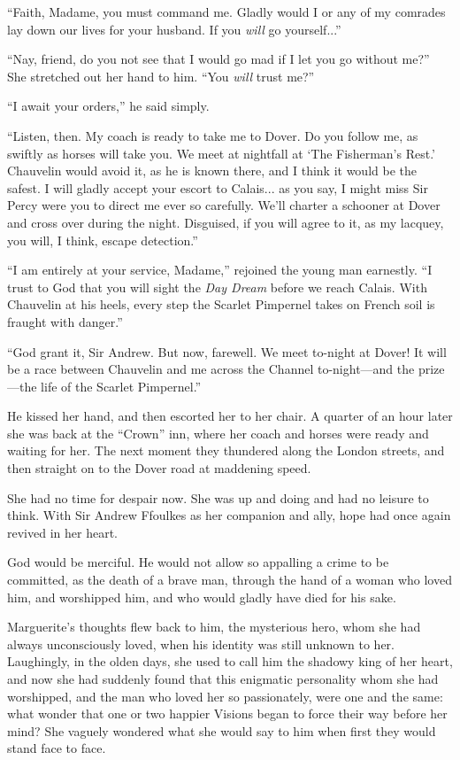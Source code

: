 \documentclass[paper=5.5in:8.5in,BCOR=7mm,twoside,DIV=calc,12pt,usegeometry,chapterprefix,endperiod,headings=big]{scrbook}
\begin{document}
\enquote{Faith, Madame, you must command me. Gladly would I or any of my comrades lay down our lives for your husband. If you \textit{will} go yourself...}

\enquote{Nay, friend, do you not see that I would go mad if I let you go without me?} She stretched out her hand to him. \enquote{You \textit{will} trust me?}

\enquote{I await your orders,} he said simply.

\enquote{Listen, then. My coach is ready to take me to Dover. Do you follow me, as swiftly as horses will take you. We meet at nightfall at \enquote{The Fisherman's Rest.} Chauvelin would avoid it, as he is known there, and I think it would be the safest. I will gladly accept your escort to Calais... as you say, I might miss Sir Percy were you to direct me ever so carefully. We'll charter a schooner at Dover and cross over during the night. Disguised, if you will agree to it, as my lacquey, you will, I think, escape detection.}

\enquote{I am entirely at your service, Madame,} rejoined the young man earnestly. \enquote{I trust to God that you will sight the \textit{Day Dream} before we reach Calais. With Chauvelin at his heels, every step the Scarlet Pimpernel takes on French soil is fraught with danger.}

\enquote{God grant it, Sir Andrew. But now, farewell. We meet to-night at Dover! It will be a race between Chauvelin and me across the Channel to-night---and the prize---the life of the Scarlet Pimpernel.}

He kissed her hand, and then escorted her to her chair. A quarter of an hour later she was back at the \enquote{Crown} inn, where her coach and horses were ready and waiting for her. The next moment they thundered along the London streets, and then straight on to the Dover road at maddening speed.

She had no time for despair now. She was up and doing and had no leisure to think. With Sir Andrew Ffoulkes as her companion and ally, hope had once again revived in her heart.

God would be merciful. He would not allow so appalling a crime to be committed, as the death of a brave man, through the hand of a woman who loved him, and worshipped him, and who would gladly have died for his sake.

Marguerite's thoughts flew back to him, the mysterious hero, whom she had always unconsciously loved, when his identity was still unknown to her. Laughingly, in the olden days, she used to call him the shadowy king of her heart, and now she had suddenly found that this enigmatic personality whom she had worshipped, and the man who loved her so passionately, were one and the same: what wonder that one or two happier Visions began to force their way before her mind? She vaguely wondered what she would say to him when first they would stand face to face.
\end{document}
